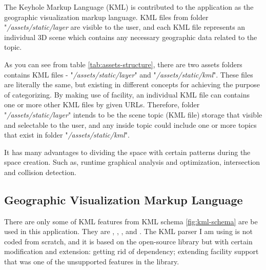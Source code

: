 The Keyhole Markup Language (KML) is contributed to the application as the geographic visualization markup language. KML files from folder "\emph{/assets/static/layer} are visible to the user, and each KML file represents an individual 3D scene which contains any necessary geographic data related to the topic.

As you can see from table \ref{tab:assets-structure}, there are two assets folders contains KML files - "\emph{/assets/static/layer}" and "\emph{/assets/static/kml}". These files are literally the same, but existing in different concepts for achieving the purpose of categorizing. By making use of  facility, an individual KML file can contains one or more other KML files by given URLs. Therefore, folder "\emph{/assets/static/layer}" intends to be the scene topic (KML file) storage that visible and selectable to the user, and any inside topic could include one or more topics that exist in folder "\emph{/assets/static/kml}".

It has many advantages to dividing the space with certain patterns during the space creation. Such as, runtime graphical analysis and optimization, intersection and collision detection.

\subsection{Geographic Visualization Markup Language}
\label{section:kml}

There are only some of KML features from KML schema \ref{fig:kml-schema} are be used in this application. They are , , , and . The KML parser I am using is not coded from scratch, and it is based on the open-source library  \cite{google.code-kml.2016} but with certain modification and extension: getting rid of  dependency; extending  facility support that was one of the unsupported features in the library.

